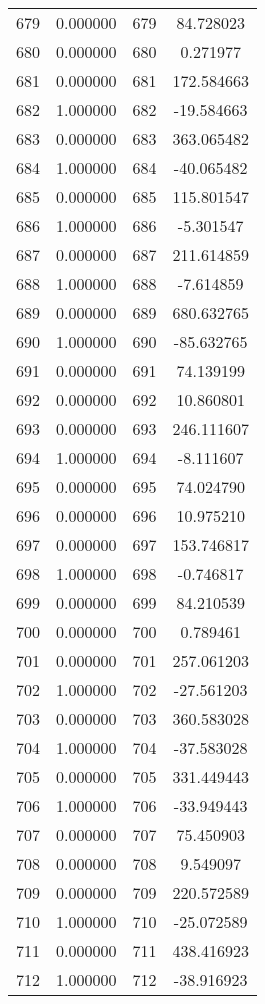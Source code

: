\documentclass[12pt]{article}
\begin{document}
\begin{longtable}{@{}cccc@{}}
679 & 0.000000 & 679 & 84.728023 \\
680 & 0.000000 & 680 & 0.271977 \\
681 & 0.000000 & 681 & 172.584663 \\
682 & 1.000000 & 682 & -19.584663 \\
683 & 0.000000 & 683 & 363.065482 \\
684 & 1.000000 & 684 & -40.065482 \\
685 & 0.000000 & 685 & 115.801547 \\
686 & 1.000000 & 686 & -5.301547 \\
687 & 0.000000 & 687 & 211.614859 \\
688 & 1.000000 & 688 & -7.614859 \\
689 & 0.000000 & 689 & 680.632765 \\
690 & 1.000000 & 690 & -85.632765 \\
691 & 0.000000 & 691 & 74.139199 \\
692 & 0.000000 & 692 & 10.860801 \\
693 & 0.000000 & 693 & 246.111607 \\
694 & 1.000000 & 694 & -8.111607 \\
695 & 0.000000 & 695 & 74.024790 \\
696 & 0.000000 & 696 & 10.975210 \\
697 & 0.000000 & 697 & 153.746817 \\
698 & 1.000000 & 698 & -0.746817 \\
699 & 0.000000 & 699 & 84.210539 \\
700 & 0.000000 & 700 & 0.789461 \\
701 & 0.000000 & 701 & 257.061203 \\
702 & 1.000000 & 702 & -27.561203 \\
703 & 0.000000 & 703 & 360.583028 \\
704 & 1.000000 & 704 & -37.583028 \\
705 & 0.000000 & 705 & 331.449443 \\
706 & 1.000000 & 706 & -33.949443 \\
707 & 0.000000 & 707 & 75.450903 \\
708 & 0.000000 & 708 & 9.549097 \\
709 & 0.000000 & 709 & 220.572589 \\
710 & 1.000000 & 710 & -25.072589 \\
711 & 0.000000 & 711 & 438.416923 \\
712 & 1.000000 & 712 & -38.916923 \\

\end{longtable}
\end{document}
